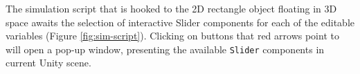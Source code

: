 %


%
%



The simulation script that is hooked to the 2D rectangle object floating in 3D space awaits the selection of interactive Slider components for each of the editable variables (Figure \ref{fig:sim-script}). Clicking on buttons that red arrows point to will open a pop-up window, presenting the available \texttt{Slider} components in current Unity scene.

